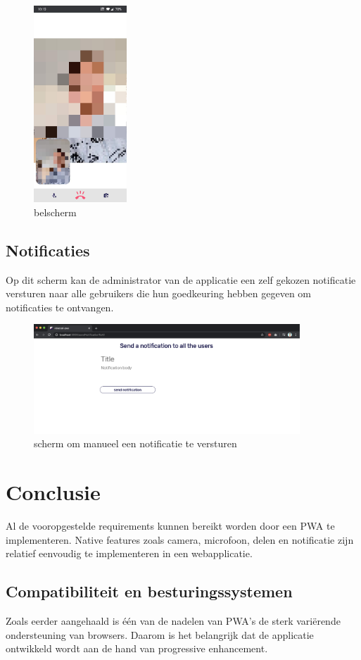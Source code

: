 	
		\begin{figure}[H]
			\centering
			\includegraphics[width=35mm]{./img/POC/call.jpg}{}		
			\caption{belscherm}
		\end{figure}
		
	\subsection{Notificaties}
		Op dit scherm kan de administrator van de applicatie een zelf gekozen notificatie versturen naar alle gebruikers die hun goedkeuring hebben gegeven om notificaties te ontvangen.
		
		\begin{figure}[H]
			\centering
			\includegraphics[width=100mm]{./img/POC/sendNoti}{}		
			\caption{scherm om manueel een notificatie te versturen}
		\end{figure}
		

\section{Conclusie}
	
	Al de vooropgestelde requirements kunnen bereikt worden door een PWA te implementeren. 
	Native features zoals camera, microfoon, delen en notificatie zijn relatief eenvoudig te implementeren in een webapplicatie.
	
	\subsection{Compatibiliteit en besturingssystemen}
		Zoals eerder aangehaald is één van de nadelen van PWA's de sterk variërende ondersteuning van browsers. Daarom is het belangrijk dat de applicatie ontwikkeld wordt aan de hand van progressive enhancement. 
		
